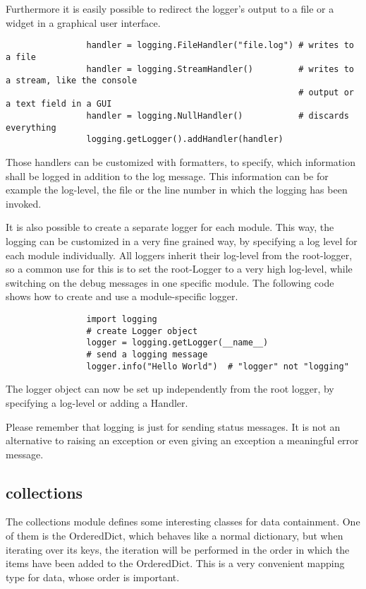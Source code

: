 			Furthermore it is easily possible to redirect the logger's output to a file or a widget in a graphical user interface.
			\begin{verbatim}
				handler = logging.FileHandler("file.log") # writes to a file
				handler = logging.StreamHandler()         # writes to a stream, like the console
				                                          # output or a text field in a GUI
				handler = logging.NullHandler()           # discards everything
				logging.getLogger().addHandler(handler)
			\end{verbatim}
			Those handlers can be customized with formatters, to specify, which information shall be logged in addition to the log message.
			This information can be for example the log-level, the file or the line number in which the logging has been invoked.

			It is also possible to create a separate logger for each module.
			This way, the logging can be customized in a very fine grained way, by specifying a log level for each module individually.
			All loggers inherit their log-level from the root-logger, so a common use for this is to set the root-Logger to a very high log-level, while switching on the debug messages in one specific module.
			The following code shows how to create and use a module-specific logger.
			\begin{verbatim}
				import logging
				# create Logger object
				logger = logging.getLogger(__name__)
				# send a logging message
				logger.info("Hello World")	# "logger" not "logging"
			\end{verbatim}
			The logger object can now be set up independently from the root logger, by specifying a log-level or adding a Handler.

			Please remember that logging is just for sending status messages.
			It is not an alternative to raising an exception or even giving an exception a meaningful error message.

		\subsection{collections}
			The collections module defines some interesting classes for data containment.
			One of them is the {\normalfont \ttfamily OrderedDict}, which behaves like a normal dictionary, but when iterating over its keys, the iteration will be performed in the order in which the items have been added to the {\normalfont \ttfamily OrderedDict}.
			This is a very convenient mapping type for data, whose order is important.

